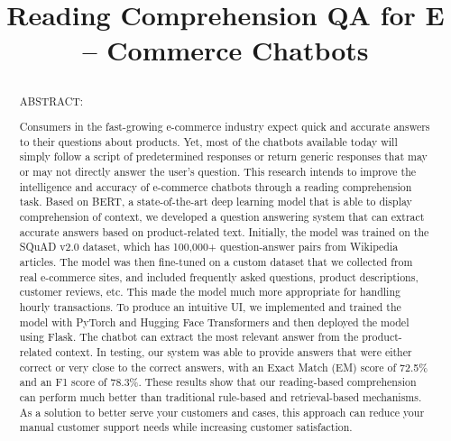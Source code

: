 \documentclass[10pt,conference]{IEEEtran}
\begin{document}
\title{Reading Comprehension QA for E – Commerce Chatbots


}

\author{
    \and
}
\maketitle

\begin{abstract}
ABSTRACT:

Consumers in the fast-growing e-commerce \cite{9} industry expect quick and accurate answers to their questions about products. Yet, most of the chatbots available today will simply follow a script of predetermined responses or return generic responses that may or may not directly answer the user’s question. This research intends to improve the intelligence and accuracy of e-commerce chatbots through a reading comprehension task. Based on BERT, a state-of-the-art deep learning model that is able to display comprehension of context, we developed a question answering system that can extract accurate answers based on product-related text.
Initially, the model was trained on the SQuAD v2.0 dataset, which has 100,000+ question-answer pairs from Wikipedia articles. The model was then fine-tuned on a custom dataset that we collected from real e-commerce sites, and included frequently asked questions, product descriptions, customer reviews, etc. This made the model much more appropriate for handling hourly transactions.
To produce an intuitive UI, we implemented and trained the model with PyTorch and Hugging Face Transformers \cite{10} and then deployed the model using Flask. The chatbot can extract the most relevant answer from the product-related context.  In testing, our system was able to provide answers that were either correct or very close to the correct answers, with an Exact Match (EM) score of 72.5\% and an F1 score of 78.3\%.  These results show that our reading-based comprehension can perform much better than traditional rule-based and retrieval-based mechanisms.  As a solution to better serve your customers and cases, this approach can reduce your manual customer support needs while increasing customer satisfaction.

\end{abstract}
\end{document}
